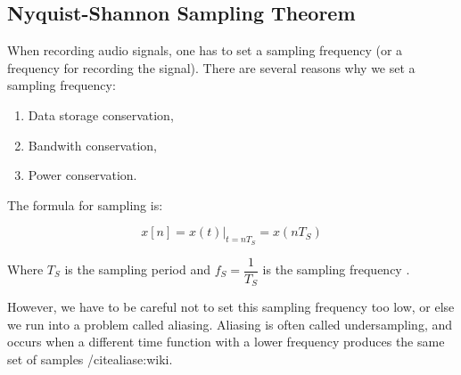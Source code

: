 \subsection{Nyquist-Shannon Sampling Theorem}
When recording audio signals, one has to set a sampling frequency (or a frequency for recording the signal). There are several reasons why we set a sampling frequency:
\begin{enumerate}
	\item Data storage conservation,
	\item Bandwith conservation,
	\item Power conservation.
\end{enumerate}

The formula for sampling is:

\begin{equation}
x[n]=x(t)|_{t=nT_{S}}=x(nT_{S})
\end{equation}

Where \(T_{S}\) is the sampling period and \(f_{S}= \dfrac{1}{T_{S}}\) is the sampling frequency \cite{notes:class}.

However, we have to be careful not to set this sampling frequency too low, or else we run into a problem called aliasing.  Aliasing is often called undersampling, and occurs when a different time function with a lower frequency produces the same set of samples /cite{aliase:wiki}.
